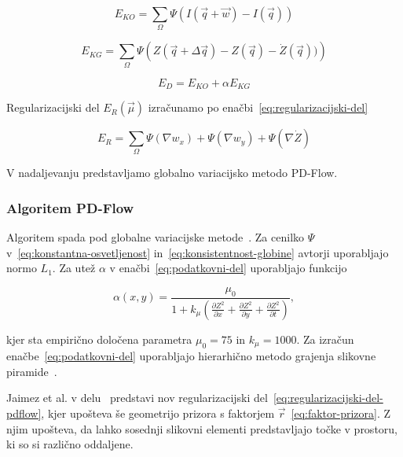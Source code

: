 \begin{equation}\label{eq:konstantna-osvetljenost}
	E_{KO} = \sum_\Omega \Psi( I(\vec{q} + \vec{w}) - I(\vec{q}))
\end{equation}

\begin{equation}\label{eq:konsistentnost-globine}
	E_{KG} = \sum_\Omega \Psi\left( Z(\vec{q} + \Delta \vec{q}) - Z(\vec{q}) - \dot{Z}(\vec{q}))\right)
\end{equation}

\begin{equation}\label{eq:podatkovni-del}
	E_D = E_{KO} + \alpha E_{KG}
\end{equation}

Regularizacijski del $E_R(\vec{\mu})$ izračunamo po enačbi~\eqref{eq:regularizacijski-del}

\begin{equation}\label{eq:regularizacijski-del}
	E_R = \sum_\Omega \Psi\left( \nabla w_x \right) + \Psi\left( \nabla w_y \right) + \Psi\left( \nabla \dot{Z} \right)
\end{equation}

V nadaljevanju predstavljamo globalno variacijsko metodo PD-Flow.


\subsubsection{Algoritem PD-Flow}\label{sec:pd-flow}
Algoritem spada pod globalne variacijske metode~\cite{jaimez2015primal}. Za cenilko $\Psi$ v~\eqref{eq:konstantna-osvetljenost} in~\eqref{eq:konsistentnost-globine} avtorji uporabljajo normo $L_1$. Za utež $\alpha$ v enačbi~\eqref{eq:podatkovni-del} uporabljajo funkcijo 

\begin{equation}\label{eq:utez}
 \alpha(x,y) = \frac{\mu_0}{1 + k_\mu \left( \frac{\partial Z^2}{\partial x} + \frac{\partial Z^2}{\partial y} + \frac{\partial Z^2}{\partial t} \right)},
\end{equation}

kjer sta empirično določena parametra $\mu_0 = 75$ in $k_\mu = 1000$. Za izračun enačbe~\eqref{eq:podatkovni-del} uporabljajo hierarhično metodo grajenja slikovne piramide~\cite{jaimez2015primal}.

Jaimez et al. v delu~\cite{jaimez2015primal} predstavi nov regularizacijski del~\eqref{eq:regularizacijski-del-pdflow}, kjer upošteva še geometrijo prizora s faktorjem $\vec{r}$~\eqref{eq:faktor-prizora}. Z njim upošteva, da lahko sosednji slikovni elementi predstavljajo točke v prostoru, ki so si različno oddaljene.

